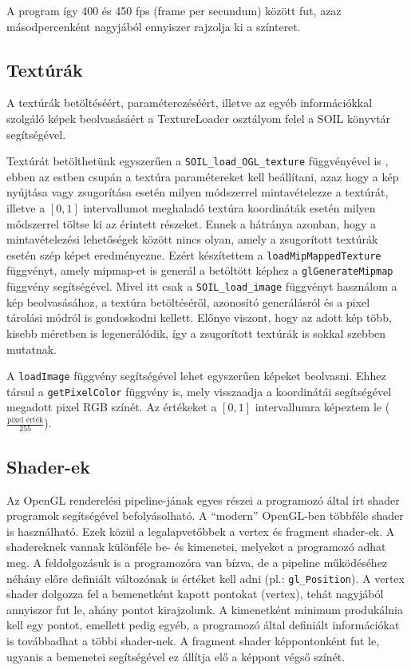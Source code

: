 A program így 400 és 450 fps (frame per secundum) között fut, azaz másodpercenként nagyjából ennyiszer rajzolja ki a színteret.

\subsection{Textúrák}

A textúrák betöltéséért, paraméterezéséért, illetve az egyéb információkkal szolgáló képek beolvasásáért a TextureLoader osztályom felel a SOIL könyvtár segítségével. 


Textúrát betölthetünk egyszerűen a \texttt{SOIL\_load\_OGL\_texture} függvényével is , ebben az estben csupán a textúra paramétereket kell beállítani, azaz hogy a kép nyújtása vagy zsugorítása esetén milyen módszerrel mintavételezze a textúrát, illetve a $[0, 1]$ intervallumot meghaladó textúra koordináták esetén milyen módszerrel töltse ki az érintett részeket. Ennek a hátránya azonban, hogy a mintavételezési lehetőségek között nincs olyan, amely a zsugorított textúrák esetén szép képet eredményezne. Ezért készítettem a \texttt{loadMipMappedTexture} függvényt, amely mipmap-et is generál a betöltött képhez a \texttt{glGenerateMipmap} függvény segítségével. Mivel itt csak a \texttt{SOIL\_load\_image} függvényt használom a kép beolvasásához, a textúra betöltéséről, azonosító generálásról és a pixel tárolási módról is gondoskodni kellett. Előnye viszont, hogy az adott kép több, kisebb méretben is legenerálódik, így a zsugorított textúrák is sokkal szebben mutatnak.

A \texttt{loadImage} függvény segítségével lehet egyszerűen képeket beolvasni. Ehhez társul a \texttt{getPixelColor} függvény is, mely visszaadja a koordinátái segítségével megadott pixel RGB színét. Az értékeket a $[0, 1]$ intervallumra képeztem le ($\frac{\text{pixel érték}}{255}$).

\subsection{Shader-ek}

Az OpenGL renderelési pipeline-jának egyes részei a programozó által írt shader programok segítségével befolyásolható. A ``modern'' OpenGL-ben többféle shader is használható. Ezek közül a legalapvetőbbek a vertex és fragment shader-ek. A shadereknek vannak különféle be- és kimenetei, melyeket a programozó adhat meg. A feldolgozásuk is a programozóra van bízva, de a pipeline működéséhez néhány előre definiált változónak is értéket kell adni (pl.: \texttt{gl\_Position}). A vertex shader dolgozza fel a bemenetként kapott pontokat (vertex), tehát nagyjából annyiszor fut le, ahány pontot kirajzolunk. A kimenetként minimum produkálnia kell egy pontot, emellett pedig egyéb, a programozó által definiált információkat is továbbadhat a többi shader-nek. A fragment shader képpontonként fut le, ugyanis a bemenetei segítségével ez állítja elő a képpont végső színét.

